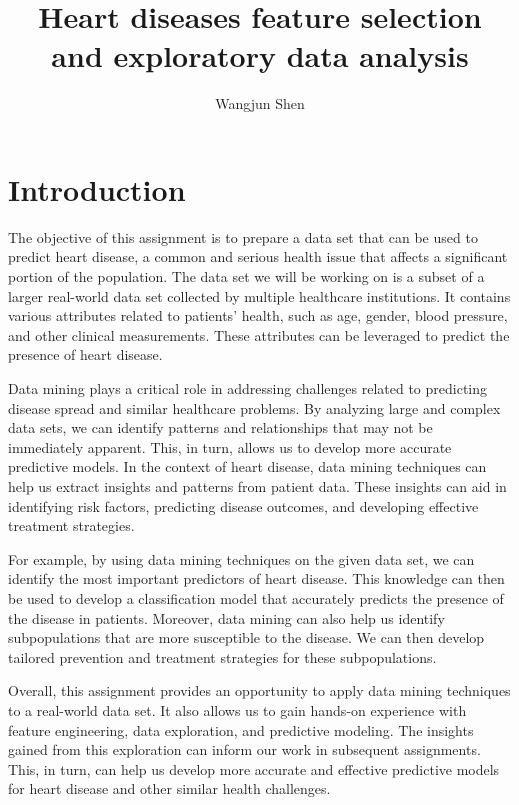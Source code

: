 \documentclass[
]{article}
\title{Heart diseases feature selection and exploratory data analysis}
\author{Wangjun Shen}
\date{}
\begin{document}
\maketitle

\hypertarget{introduction}{%
\section{Introduction}\label{introduction}}

The objective of this assignment is to prepare a data set that can be
used to predict heart disease, a common and serious health issue that
affects a significant portion of the population. The data set we will be
working on is a subset of a larger real-world data set collected by
multiple healthcare institutions. It contains various attributes related
to patients' health, such as age, gender, blood pressure, and other
clinical measurements. These attributes can be leveraged to predict the
presence of heart disease.

Data mining plays a critical role in addressing challenges related to
predicting disease spread and similar healthcare problems. By analyzing
large and complex data sets, we can identify patterns and relationships
that may not be immediately apparent. This, in turn, allows us to
develop more accurate predictive models. In the context of heart
disease, data mining techniques can help us extract insights and
patterns from patient data. These insights can aid in identifying risk
factors, predicting disease outcomes, and developing effective treatment
strategies.

For example, by using data mining techniques on the given data set, we
can identify the most important predictors of heart disease. This
knowledge can then be used to develop a classification model that
accurately predicts the presence of the disease in patients. Moreover,
data mining can also help us identify subpopulations that are more
susceptible to the disease. We can then develop tailored prevention and
treatment strategies for these subpopulations.

Overall, this assignment provides an opportunity to apply data mining
techniques to a real-world data set. It also allows us to gain hands-on
experience with feature engineering, data exploration, and predictive
modeling. The insights gained from this exploration can inform our work
in subsequent assignments. This, in turn, can help us develop more
accurate and effective predictive models for heart disease and other
similar health challenges.
\end{document}
